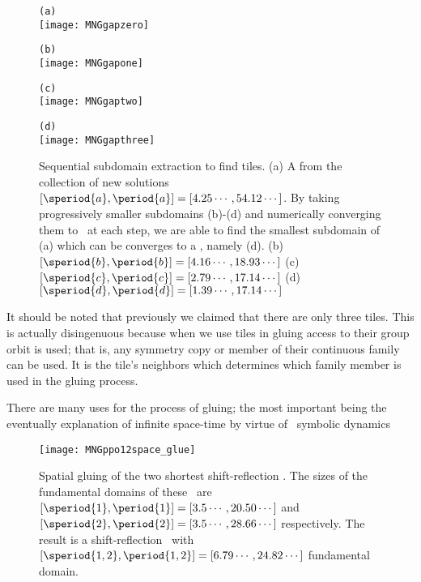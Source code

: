 \begin{itemize}
{\begin{figure}
\begin{minipage}[height=.2\textheight]{.5\textwidth}
\centering \small{\texttt{(a)}}\\
\texttt{[image: MNGgapzero]}
\end{minipage}
\begin{minipage}[height=.2\textheight]{.5\textwidth}
\centering \small{\texttt{(b)}}\\
\texttt{[image: MNGgapone]}
\end{minipage}
\begin{minipage}[height=.2\textheight]{.5\textwidth}
\centering \small{\texttt{(c)}}\\
\texttt{[image: MNGgaptwo]}
\end{minipage}
\begin{minipage}[height=.2\textheight]{.48\textwidth}
\centering \small{\texttt{(d)}}\\
\texttt{[image: MNGgapthree]}
\end{minipage}
\caption{ \label{fig:KStileextraction}
Sequential subdomain extraction to find tiles.
(a) A {\po} from the collection of new solutions
$[\speriod{a},\period{a}]=[4.25\cdots,54.12\cdots]$.
By taking progressively smaller subdomains (b)-(d) and numerically
converging them to \twots\ at each step, we are able to
find the smallest subdomain of (a) which can be converges
to a \twot, namely (d).
(b)$[\speriod{b},\period{b}]=[4.16\cdots,18.93\cdots]$
(c)$[\speriod{c},\period{c}]=[2.79\cdots,17.14\cdots]$
(d)$[\speriod{d},\period{d}]=[1.39\cdots,17.14\cdots]$
}
\end{figure}


It should be noted that previously we claimed that
there are only three tiles. This is actually disingenuous because when we use tiles
in gluing access to their group orbit is used; that is, any symmetry copy or member
of their continuous family can be used. It is the tile's neighbors which
determines which family member is used in the gluing process.

There are many uses for the process of gluing; the most important being the
eventually explanation of infinite space-time by virtue of \spt\ symbolic
dynamics

\begin{figure}
\centering
\begin{minipage}[height=.4\textheight]{.66\textwidth}
\centering
\texttt{[image: MNGppo12space\_glue]}
\end{minipage}
\caption{ \label{fig:MNGppo12spaceglue}
Spatial gluing of the two shortest shift-reflection
\twots. The sizes of the fundamental domains of these
\twots\ are
$[\speriod{1},\period{1}]=[3.5\cdots,20.50\cdots]$
and
$[\speriod{2},\period{2}]=[3.5\cdots,28.66\cdots]$
respectively.
The result is a
shift-reflection \twot\ with
$[\speriod{1,2},\period{1,2}]=[6.79\cdots,24.82\cdots]$
fundamental domain.
}
\end{figure}


}
\end{itemize}
